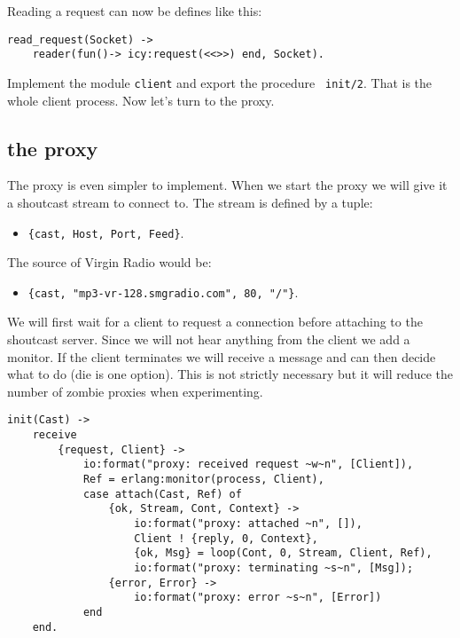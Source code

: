 \documentclass[a4paper,11pt]{article}
\begin{document}
Reading a request can now be defines like this:

\begin{verbatim}    
read_request(Socket) ->
    reader(fun()-> icy:request(<<>>) end, Socket).
\end{verbatim}

Implement the module {\tt client} and export the procedure {\tt
  init/2}.  That is the whole client process. Now let's turn to the
proxy.


\subsection{the proxy}

The proxy is even simpler to implement. When we start the proxy we
will give it a shoutcast stream to connect to. The stream is defined
by a tuple:

\begin{itemize}
\item {\tt \{cast, Host, Port, Feed\}}.
\end{itemize}

The source of Virgin Radio would be: 

\begin{itemize}
\item {\tt \{cast, "mp3-vr-128.smgradio.com", 80, "/"\}}.
\end{itemize}

We will first wait for a client to request a connection before
attaching to the shoutcast server. Since we will not hear anything
from the client we add a monitor. If the client terminates we will
receive a message and can then decide what to do (die is one
option). This is not strictly necessary but it will reduce the number
of zombie proxies when experimenting.

\begin{verbatim}
init(Cast) -> 
    receive 
        {request, Client} ->
            io:format("proxy: received request ~w~n", [Client]),
            Ref = erlang:monitor(process, Client),
            case attach(Cast, Ref) of 
                {ok, Stream, Cont, Context} -> 
                    io:format("proxy: attached ~n", []),
                    Client ! {reply, 0, Context}, 
                    {ok, Msg} = loop(Cont, 0, Stream, Client, Ref),
                    io:format("proxy: terminating ~s~n", [Msg]);
                {error, Error} -> 
                    io:format("proxy: error ~s~n", [Error])
            end
    end.
\end{verbatim}
\end{document}
